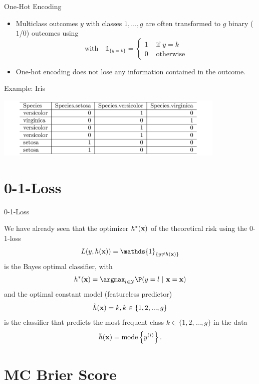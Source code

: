 \documentclass[11pt,compress,t,notes=noshow, xcolor=table]{beamer}
\begin{document}
\begin{vbframe}{One-Hot Encoding}
\begin{itemize}
\item Multiclass outcomes $y$ with classes $1,\dots, g$ are often transformed to $g$ binary ($1$/$0$) outcomes 
using 
$$
\text{with}\quad \mathds{1}_{\{y = k\}} = \begin{cases} 1 & \text{ if } y = k \\
0 & \text{ otherwise}\end{cases}
$$
\item One-hot encoding does not lose any information contained in the outcome. 
\end{itemize}
\vspace{0.2cm}
Example: Iris

\vspace*{0.1cm}
\begin{center}
\includegraphics[width = 11cm ]{figure/iris_encoding.png}
\end{center}

\end{vbframe}

\section{0-1-Loss}

\begin{vbframe}{0-1-Loss}

We have already seen that the optimizer $h^{\ast}(\mathbf{x})$ of the theoretical risk using the 0-1-loss 
$$ 
L(y, \hx) = \mathds{1}_{\{y \neq \hx\}} 
$$
is the Bayes optimal classifier, with
$$ 
\hxbayes = \argmax_{l \in \Yspace} \P(y = l~|~ \xv = \xv)
$$
and the optimal constant model (featureless predictor) 
$$
\hat{h}(\mathbf{x}) = k, k \in \{1, 2, ..., g\} 
$$
is the classifier that predicts the most frequent class $k \in \{1, 2, ..., g\}$ in the data
$$
\hat{h}(\mathbf{x}) = \text{mode} \left\{y^{(i)}\right\}.
$$
\framebreak



\end{vbframe}



\section{MC Brier Score}
\end{document}
